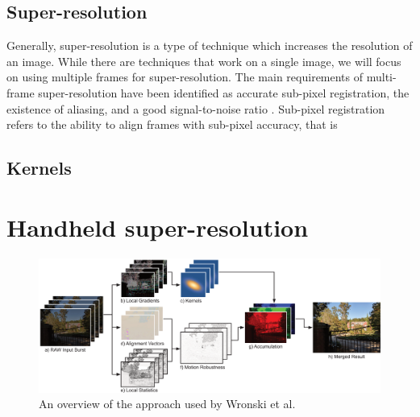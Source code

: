 \documentclass{sig-alternate}
\begin{document}

\subsection{Super-resolution}
\label{sec:background:superResolution}

Generally, super-resolution is a type of technique which increases the resolution of an image. While there are techniques that work on a single image, we will focus on using multiple frames for super-resolution. The main requirements of multi-frame super-resolution have been identified as accurate sub-pixel registration, the existence of aliasing, and a good signal-to-noise ratio \cite{Wronski2019}. Sub-pixel registration refers to the ability to align frames with sub-pixel accuracy, that is 



\subsection{Kernels}
\label{sec:background:kernels}



\section{Handheld super-resolution}
\label{sec:handheldSuperRes}


\begin{figure}[t!]
\centering
\includegraphics[width=7in]{Wronski2019-figure-2}
\caption{An overview of the approach used by Wronski et al. \cite{Wronski2019}}
\label{fig:Wronski2019Fig2}
\end{figure}
\end{document}
